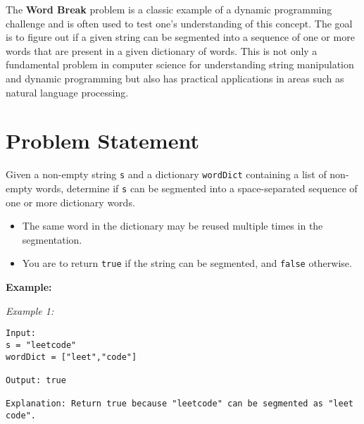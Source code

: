 
\label{problem:word_break}
    
The \textbf{Word Break} problem is a classic example of a dynamic programming challenge and is often used to test one's understanding of this concept. The goal is to figure out if a given string can be segmented into a sequence of one or more words that are present in a given dictionary of words. This is not only a fundamental problem in computer science for understanding string manipulation and dynamic programming but also has practical applications in areas such as natural language processing.
    
\section*{Problem Statement}

Given a non-empty string \texttt{s} and a dictionary \texttt{wordDict} containing a list of non-empty words, determine if \texttt{s} can be segmented into a space-separated sequence of one or more dictionary words.

\begin{itemize}
    \item The same word in the dictionary may be reused multiple times in the segmentation.
    \item You are to return \texttt{true} if the string can be segmented, and \texttt{false} otherwise.
\end{itemize}

\textbf{Example:}

\textit{Example 1:}

\begin{verbatim}
Input:
s = "leetcode"
wordDict = ["leet","code"]

Output: true

Explanation: Return true because "leetcode" can be segmented as "leet code".
\end{verbatim}



